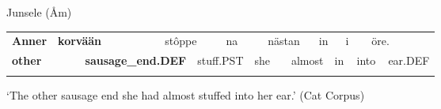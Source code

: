 \begin{listWWNumileveli}
\item {}

\begin{styleExample}
Junsele (Åm)

\end{styleExample}

\end{listWWNumileveli}

\begin{tabular}{llllllllllllllll}
\lsptoprule
{\bfseries Anner} & \multicolumn{2}{l}{{\bfseries korvään}

} & \multicolumn{2}{l}{stôppe

} & \multicolumn{2}{l}{na

} & \multicolumn{2}{l}{nästan

} & \multicolumn{2}{l}{in

} & \multicolumn{2}{l}{i

} & \multicolumn{2}{l}{öre.

} & \\
\multicolumn{2}{l}{{\bfseries other}

} & \multicolumn{2}{l}{{\bfseries sausage\_end.DEF}

} & \multicolumn{2}{l}{stuff.PST

} & \multicolumn{2}{l}{she

} & \multicolumn{2}{l}{almost

} & \multicolumn{2}{l}{in

} & \multicolumn{2}{l}{into

} & \multicolumn{2}{l}{ear.DEF

}\\
\lspbottomrule
\end{tabular}

\begin{styleTranslation}
‘The other sausage end she had almost stuffed into her ear.’ (Cat Corpus)

\end{styleTranslation}


